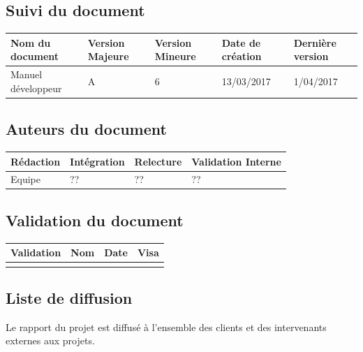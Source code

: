 \documentclass[10pt,a4paper]{article}
\begin{document}
\newpage


\subsection*{Suivi du document}

\begin{center}
    \begin{tabular}{| l | l | l | l | l |}
    \hline
     \rowcolor{gray} Nom du document & Version Majeure & Version Mineure & Date de création & Dernière version \\ \hline
    Manuel développeur & A & 6 & 13/03/2017 & 1/04/2017 \\ \hline
    \end{tabular}
\end{center}


\subsection*{Auteurs du document}

\begin{center}
    \begin{tabular}{| l | l | l | l |}
    \hline
    \rowcolor{gray} Rédaction & Intégration & Relecture & Validation Interne \\ \hline
    Equipe & ?? & ?? & ?? \\ \hline

    \end{tabular}
\end{center}

\subsection*{Validation du document}

\begin{center}
    \begin{tabular}{| l | l | l | l |}
    \hline
     \rowcolor{gray} Validation & Nom & Date & Visa \\ \hline
    & & & \\
     \hline
    \end{tabular}
\end{center}

\subsection*{Liste de diffusion}

Le rapport du projet est diffusé à l'ensemble des clients et des intervenants externes aux projets.
\end{document}
